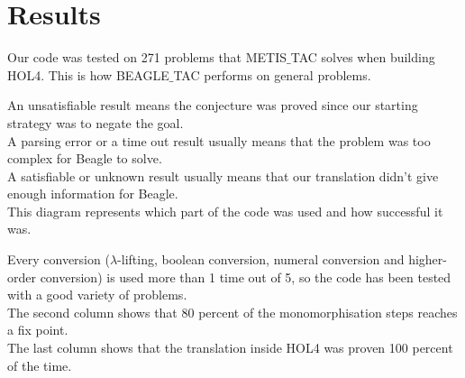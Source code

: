 \documentclass[a4paper, 11pt]{article}
\theoremstyle{plain}
\theoremstyle{definition}
\theoremstyle{remark}
\begin{document}
\section{Results}
Our code was tested on 271 problems that METIS$\_$TAC solves when building HOL4. This is how BEAGLE$\_$TAC performs on general problems.

\begin{center}
\end{center}

\noindent An unsatisfiable result means the conjecture was proved since our starting strategy was to negate the goal.
\\A parsing error or a time out result usually means that the problem was too complex for Beagle to solve.
\\A satisfiable or unknown result usually means that our translation didn't give enough information for Beagle.
\vspace{5mm}
\\
This diagram represents which part of the code was used and how successful it was.
\begin{center}
\end{center}

\noindent Every conversion ($\lambda$-lifting, boolean conversion, numeral conversion and higher-order conversion) is used more than 1 time out of 5, so the code has been tested with a good variety of problems. 
\\The second column shows that 80 percent of the monomorphisation steps reaches a fix point.
\\The last column shows that the translation inside HOL4 was proven 100 percent of the time.
\vspace{5mm}
\end{document}
